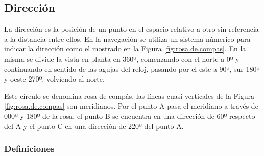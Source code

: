 \subsection{Direcci\'on}
\label{sec:direccion}

La direcci\'on es la posici\'on de un punto en el espacio relativo a otro sin referencia a la distancia entre ellos. En la navegaci\'on se utiliza un sistema n\'umerico para indicar la direcci\'on como el mostrado en la Figura \ref{fig:rosa.de.compas}. En la misma se divide la vista en planta en 360º, comenzando con el norte a 0º y continuando en sentido de las agujas del reloj, pasando por el este a 90º, sur 180º y oeste 270º, volviendo al norte.

Este c\'irculo se denomina rosa de comp\'as, las l\'ineas cuasi-verticales de la Figura \ref{fig:rosa.de.compas} son meridianos. Por el punto A pasa el meridiano a trav\'es de 000º y 180º de la rosa, el punto B se encuentra en una direcci\'on de 60º respecto del A y el punto C en una direcci\'on de 220º del punto A.

\subsubsection{Definiciones}
\label{sec:definiciones.navegacion}

